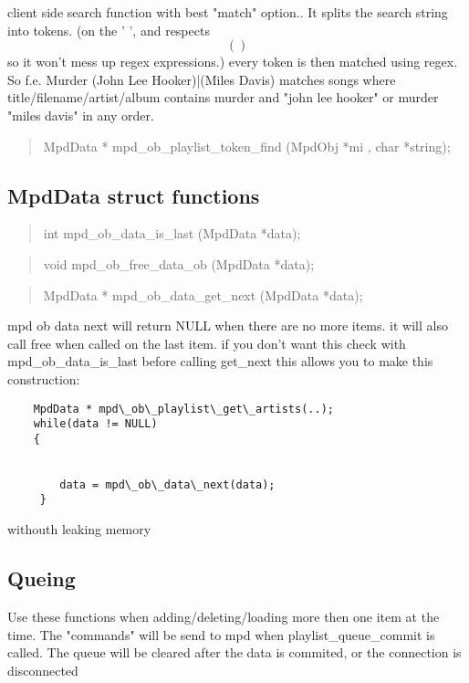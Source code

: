 \documentclass[a4paper,11pt]{article}
\begin{document}
	client side search function with best "match" option..
	It splits the search string into tokens. (on the ' ', and respects \[()\] so it won't mess up regex expressions.)  every token is then matched using regex.
	So f.e. Murder (John Lee Hooker)|(Miles Davis)  matches songs where title/filename/artist/album contains murder and "john lee hooker" 
	or murder "miles davis" in any order.\\
	{\color{red}{Warning: This function can be slow. For better performance use the server side use.}}
	
	\begin{quote}
	MpdData * mpd\_ob\_playlist\_token\_find  (MpdObj *mi , char *string);
	\end{quote}
	
	\subsection{MpdData struct functions}
	
	\begin{quote}
	int   mpd\_ob\_data\_is\_last   (MpdData *data);
	\end{quote}
	
	\begin{quote}
	void   mpd\_ob\_free\_data\_ob   (MpdData *data);
	\end{quote}
	
	\begin{quote}
	MpdData *  mpd\_ob\_data\_get\_next   (MpdData *data);
	\end{quote}
	
	mpd ob data next will return NULL when there are no more items. it will also call free when called on the last item.
	if you don't want this check with mpd\_ob\_data\_is\_last before calling get\_next
	this allows you to make this construction:
	
	\begin{verbatim}
	MpdData * mpd\_ob\_playlist\_get\_artists(..);
	while(data != NULL)
	{
	
	
		data = mpd\_ob\_data\_next(data);
	 }
	\end{verbatim}
	
	withouth leaking memory 
	
	
	\subsection{Queing}
	
	
	Use these functions when adding/deleting/loading more then one item at the time.
	The "commands" will be send to mpd when playlist\_queue\_commit is called.
	The queue will be cleared after the data is commited, or the connection is disconnected
	
\end{document}
